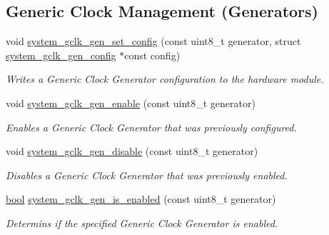 \subsection*{Generic Clock Management (Generators)}
\begin{DoxyCompactItemize}
\item 
void \mbox{\hyperlink{group__asfdoc__sam0__system__clock__group_gacfd3360ccc8abb013f66b11ff44a5d0d}{system\+\_\+gclk\+\_\+gen\+\_\+set\+\_\+config}} (const uint8\+\_\+t generator, struct \mbox{\hyperlink{structsystem__gclk__gen__config}{system\+\_\+gclk\+\_\+gen\+\_\+config}} $\ast$const config)
\begin{DoxyCompactList}\small\item\em Writes a Generic Clock Generator configuration to the hardware module. \end{DoxyCompactList}\item 
void \mbox{\hyperlink{group__asfdoc__sam0__system__clock__group_ga2bad007fcf1f649a3919dcc72dccea8b}{system\+\_\+gclk\+\_\+gen\+\_\+enable}} (const uint8\+\_\+t generator)
\begin{DoxyCompactList}\small\item\em Enables a Generic Clock Generator that was previously configured. \end{DoxyCompactList}\item 
void \mbox{\hyperlink{group__asfdoc__sam0__system__clock__group_ga98a280a22a780c05e87c676f8c651dc3}{system\+\_\+gclk\+\_\+gen\+\_\+disable}} (const uint8\+\_\+t generator)
\begin{DoxyCompactList}\small\item\em Disables a Generic Clock Generator that was previously enabled. \end{DoxyCompactList}\item 
\mbox{\hyperlink{group__group__sam0__utils_ga97a80ca1602ebf2303258971a2c938e2}{bool}} \mbox{\hyperlink{group__asfdoc__sam0__system__clock__group_ga113af9a430f74e082401383109e4eefd}{system\+\_\+gclk\+\_\+gen\+\_\+is\+\_\+enabled}} (const uint8\+\_\+t generator)
\begin{DoxyCompactList}\small\item\em Determins if the specified Generic Clock Generator is enabled. \end{DoxyCompactList}\end{DoxyCompactItemize}
